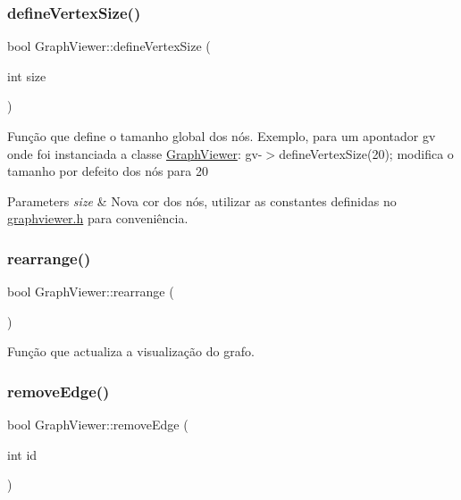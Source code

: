 \subsubsection{\texorpdfstring{defineVertexSize()}{defineVertexSize()}}
{\footnotesize\ttfamily bool Graph\+Viewer\+::define\+Vertex\+Size (\begin{DoxyParamCaption}\item[{int}]{size }\end{DoxyParamCaption})}

Função que define o tamanho global dos nós. Exemplo, para um apontador gv onde foi instanciada a classe \mbox{\hyperlink{class_graph_viewer}{Graph\+Viewer}}\+: gv-\/$>$define\+Vertex\+Size(20); modifica o tamanho por defeito dos nós para 20


\begin{DoxyParams}{Parameters}
{\em size} & Nova cor dos nós, utilizar as constantes definidas no \mbox{\hyperlink{graphviewer_8h_source}{graphviewer.\+h}} para conveniência. \\
\hline
\end{DoxyParams}
\mbox{\label{class_graph_viewer_a3009a66958686ccb7e78b68e37c3c423}} 
\subsubsection{\texorpdfstring{rearrange()}{rearrange()}}
{\footnotesize\ttfamily bool Graph\+Viewer\+::rearrange (\begin{DoxyParamCaption}{ }\end{DoxyParamCaption})}

Função que actualiza a visualização do grafo. \mbox{\label{class_graph_viewer_a9a8ee68c7c12b373affbe4069dd95d72}} 
\subsubsection{\texorpdfstring{removeEdge()}{removeEdge()}}
{\footnotesize\ttfamily bool Graph\+Viewer\+::remove\+Edge (\begin{DoxyParamCaption}\item[{int}]{id }\end{DoxyParamCaption})}

